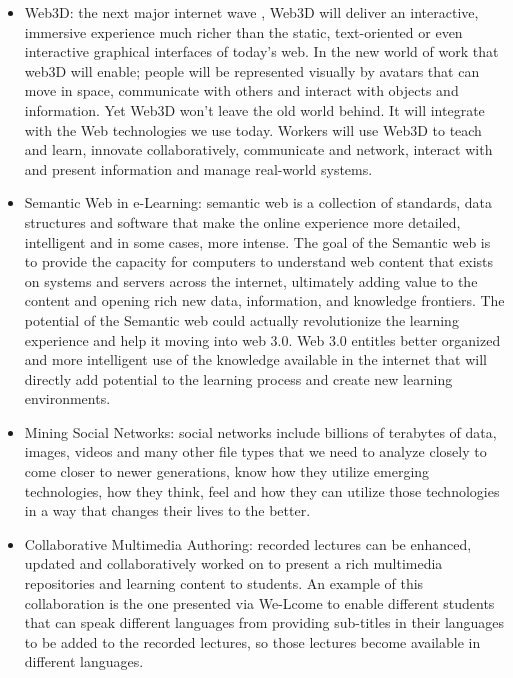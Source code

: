 \documentclass[12pt,a4paper,final,twoside,onecolumn,titlepage]{book}
\begin{document}
\begin{itemize}
\item Web3D: the next major internet wave \cite{W33}, Web3D will deliver an interactive, immersive experience much richer than the static, text-oriented or even interactive graphical interfaces of today’s web. In the new world of work that web3D will enable; people will be represented visually by avatars that can move in space, communicate with others and interact with objects and information. Yet Web3D won’t leave the old world behind. It will integrate with the Web technologies we use today. Workers will use Web3D to teach and learn, innovate collaboratively, communicate and network, interact with and present information and manage real-world systems.

\item Semantic Web in e-Learning: semantic web is a collection of standards, data structures and software that make the online experience more detailed, intelligent and in some cases, more intense. The goal of the Semantic web is to provide the capacity for computers to understand web content that exists on systems and servers across the internet, ultimately adding value to the content and opening rich new data, information, and knowledge frontiers. The potential of the Semantic web could actually revolutionize the learning experience and help it moving into web 3.0. Web 3.0 entitles better organized and more intelligent use of the knowledge available in the internet that will directly add potential to the learning process and create new learning environments.

\item Mining Social Networks: social networks include billions of terabytes of data, images, videos and many other file types that  we need to analyze closely to come closer to newer generations, know how they utilize emerging technologies, how they think, feel and how they can utilize those technologies in a way that changes their lives to the better.

\item Collaborative Multimedia Authoring: recorded lectures can be enhanced, updated and collaboratively worked on to present a rich multimedia repositories and learning content to students. An example of this collaboration is the one presented via We-Lcome to enable different students that can speak different languages from providing sub-titles in their languages to be added to the recorded lectures, so those lectures become available in different languages.


\end{itemize}
\end{document}
